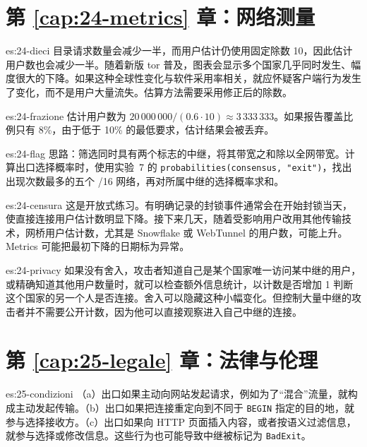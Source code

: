 \section*{第 \ref{cap:24-metrics} 章：网络测量}

\begin{soluzione}{es:24-dieci}
目录请求数量会减少一半，而用户估计仍使用固定除数 10，因此估计用户数也会减少一半。随着新版 tor 普及，图表会显示多个国家几乎同时发生、幅度很大的下降。如果这种全球性变化与软件采用率相关，就应怀疑客户端行为发生了变化，而不是用户大量流失。估算方法需要采用修正后的除数。
\end{soluzione}

\begin{soluzione}{es:24-frazione}
估计用户数为 $20\,000\,000/(0.6\cdot10)\approx3\,333\,333$。如果报告覆盖比例只有 8\%，由于低于 10\% 的最低要求，估计结果会被丢弃。
\end{soluzione}

\begin{soluzione}{es:24-flag}
思路：筛选同时具有两个标志的中继，将其带宽之和除以全网带宽。计算出口选择概率时，使用实验~7 的 \texttt{probabilities(consensus, "exit")}，找出出现次数最多的五个 /16 网络，再对所属中继的选择概率求和。
\end{soluzione}

\begin{soluzione}{es:24-censura}
这是开放式练习。有明确记录的封锁事件通常会在开始封锁当天，使直接连接用户估计数明显下降。接下来几天，随着受影响用户改用其他传输技术，网桥用户估计数，尤其是 Snowflake 或 WebTunnel 的用户数，可能上升。Metrics 可能把最初下降的日期标为异常。
\end{soluzione}

\begin{soluzione}{es:24-privacy}
如果没有舍入，攻击者知道自己是某个国家唯一访问某中继的用户，或精确知道其他用户数量时，就可以检查额外信息统计，以计数是否增加 1 判断这个国家的另一个人是否连接。舍入可以隐藏这种小幅变化。但控制大量中继的攻击者并不需要公开计数，因为他可以直接观察进入自己中继的连接。
\end{soluzione}

\section*{第 \ref{cap:25-legale} 章：法律与伦理}

\begin{soluzione}{es:25-condizioni}
（a）出口如果主动向网站发起请求，例如为了\enquote{混合}流量，就构成主动发起传输。（b）出口如果把连接重定向到不同于 \texttt{BEGIN} 指定的目的地，就参与选择接收方。（c）出口如果向 HTTP 页面插入内容，或者按语义过滤信息，就参与选择或修改信息。这些行为也可能导致中继被标记为 \texttt{BadExit}。
\end{soluzione}

